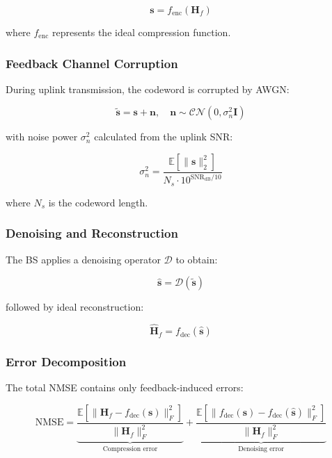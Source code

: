 \documentclass[lettersize,journal]{IEEEtran}
\begin{document}
\begin{equation}
    \mathbf{s} = f_{\text{enc}}(\mathbf{H}_f)
\end{equation}

where $f_{\text{enc}}$ represents the ideal compression function.

\subsubsection{Feedback Channel Corruption}
During uplink transmission, the codeword is corrupted by AWGN:

\begin{equation}
    \tilde{\mathbf{s}} = \mathbf{s} + \mathbf{n}, \quad \mathbf{n} \sim \mathcal{CN}(0,\sigma_n^2\mathbf{I})
    \label{eq:noisy_feedback}
\end{equation}

with noise power $\sigma_n^2$ calculated from the uplink SNR:

\begin{equation}
    \sigma_n^2 = \frac{\mathbb{E}[\|\mathbf{s}\|_2^2]}{N_s \cdot 10^{\text{SNR}_{\text{dB}}/10}}
\end{equation}

where $N_s$ is the codeword length.

\subsubsection{Denoising and Reconstruction}
The BS applies a denoising operator $\mathcal{D}$ to obtain:

\begin{equation}
    \hat{\mathbf{s}} = \mathcal{D}(\tilde{\mathbf{s}})
\end{equation}

followed by ideal reconstruction:

\begin{equation}
    \hat{\mathbf{H}}_f = f_{\text{dec}}(\hat{\mathbf{s}})
\end{equation}

\subsubsection{Error Decomposition}
The total NMSE contains only feedback-induced errors:

\begin{equation}
    \text{NMSE} = \underbrace{\frac{\mathbb{E}[\|\mathbf{H}_f - f_{\text{dec}}(\mathbf{s})\|_F^2]}{\|\mathbf{H}_f\|_F^2}}_{\text{Compression error}} + \underbrace{\frac{\mathbb{E}[\|f_{\text{dec}}(\mathbf{s}) - f_{\text{dec}}(\hat{\mathbf{s}})\|_F^2]}{\|\mathbf{H}_f\|_F^2}}_{\text{Denoising error}}
\end{equation}
\end{document}
